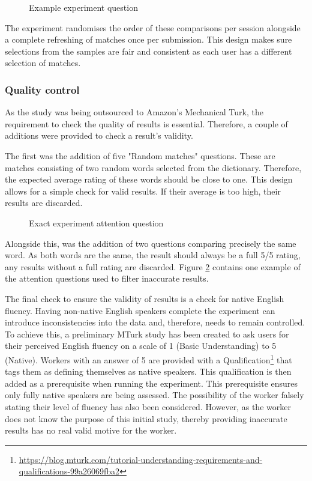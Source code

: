 \begin{figure}[h!]
    \centering
    \caption{Example experiment question}
    \label{fig:phoneticMatch}
\end{figure}

The experiment randomises the order of these comparisons per session alongside a complete refreshing of matches once per submission. This design makes sure selections from the samples are fair and consistent as each user has a different selection of matches.

\subsubsection{Quality control}
\label{sec:exp1_qualitycontrol}
As the study was being outsourced to Amazon's Mechanical Turk, the requirement to check the quality of results is essential. Therefore, a couple of additions were provided to check a result's validity.

The first was the addition of five "Random matches" questions. These are matches consisting of two random words selected from the dictionary. Therefore, the expected average rating of these words should be close to one. This design allows for a simple check for valid results. If their average is too high, their results are discarded.

\begin{figure}[h!]
    \centering
    \caption{Exact experiment attention question}
    \label{fig:exactMatch}
\end{figure}

Alongside this, was the addition of two questions comparing precisely the same word. As both words are the same, the result should always be a full 5/5 rating, any results without a full rating are discarded. Figure \ref{fig:exactMatch} contains one example of the attention questions used to filter inaccurate results.

The final check to ensure the validity of results is a check for native English fluency. Having non-native English speakers complete the 
experiment can introduce inconsistencies into the 
data and, therefore, needs to remain controlled. To achieve this, a preliminary MTurk study has been created to ask users for their perceived 
English fluency on a scale of 1 (Basic Understanding) to 5 (Native). 
Workers with an answer of 5 are provided with a 
Qualification\footnote{\url{https://blog.mturk.com/tutorial-understanding-requirements-and-qualifications-99a26069fba2}} 
that tags them as defining themselves as native speakers. This qualification is then 
added as a prerequisite when running the experiment. This prerequisite ensures 
only fully native speakers are being assessed. The possibility of the 
worker falsely stating their level of fluency has also been considered. 
However, as the worker does not know the purpose of this initial study,
thereby providing inaccurate results has no real valid motive for the 
worker.

